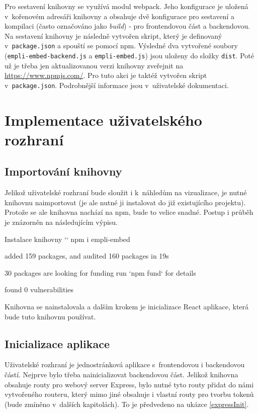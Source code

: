 \documentclass[czech, bc, kiv, he, iso690numb, viewonly]{fasthesis} %
\begin{document}
Pro sestavení knihovny se využívá modul webpack. Jeho konfigurace je uložená v~kořenovém adresáři knihovny a obsahuje dvě konfigurace pro sestavení a kompilaci (často
označováno jako \textit{build}) - pro frontendovou část a backendovou.
Na sestavení knihovny je následně vytvořen skript, který je definovaný v~\texttt{package.json} a spouští se pomocí npm. Výsledné dva vytvořené soubory (\texttt{empli-embed-backend.js} a \texttt{empli-embed.js})
jsou uloženy do složky \texttt{dist}. Poté už je třeba jen aktualizovanou verzi knihovny zveřejnit na \url{https://www.npmjs.com/}. Pro tuto akci je taktéž vytvořen skript v~\texttt{package.json}.
Podrobnější informace jsou v~uživatelské dokumentaci.

\section{Implementace uživatelského rozhraní}

\subsection{Importování knihovny}

Jelikož uživatelské rozhraní bude sloužit i k~náhledům na vizualizace, je nutné knihovnu naimportovat (je ale nutné ji instalovat do již existujícího projektu). Protože se ale knihovna nachází na npm, bude to velice snadné.
Postup i průběh je znázorněn na následujícím výpisu.
\begin{console}{Instalace knihovny}
`\winprompt` npm i empli-embed

added 159 packages, and audited 160 packages in 19s

30 packages are looking for funding
  run `npm fund` for details

found 0 vulnerabilities
\end{console}

Knihovna se nainstalovala a dalším krokem je inicializace React aplikace, která bude tuto knihovnu používat.

\subsection{Inicializace aplikace}

Uživatelské rozhraní je jednostránková aplikace s~frontendovou i backendovou částí. Nejprve bylo třeba nainicializovat backendovou část. Jelikož knihovna obsahuje routy pro webový
server Express, bylo nutné tyto routy přidat do námi vytvořeného routeru, který mimo jiné obsahuje i vlastní routy pro tvorbu tokenů (bude zmíněno v~dalších kapitolách). To je předvedeno na
ukázce \ref{expressInit}.
\end{document}
